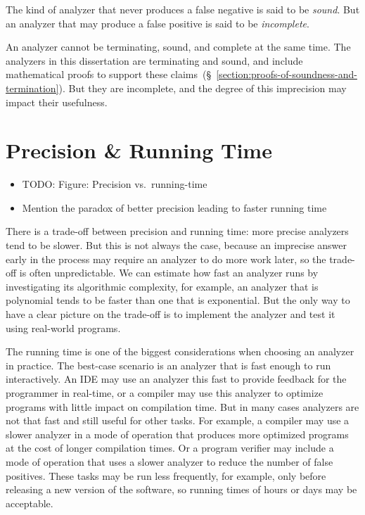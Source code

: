 \documentclass[12pt, oneside]{book}
\begin{document}
The kind of analyzer that never produces a false negative is said to be \emph{sound}. But an analyzer that may produce a false positive is said to be \emph{incomplete}.

An analyzer cannot be terminating, sound, and complete at the same time. The analyzers in this dissertation are terminating and sound, and include mathematical proofs to support these claims~(§~\ref{section:proofs-of-soundness-and-termination}). But they are incomplete, and the degree of this imprecision may impact their usefulness.

\section{Precision \& Running Time}
\label{section:precision-and-running-time}

\begin{itemize}
  \item TODO: Figure: Precision vs.\ running-time
  \item Mention the paradox of better precision leading to faster running time
\end{itemize}

There is a trade-off between precision and running time: more precise analyzers tend to be slower. But this is not always the case, because an imprecise answer early in the process may require an analyzer to do more work later, so the trade-off is often unpredictable. We can estimate how fast an analyzer runs by investigating its algorithmic complexity, for example, an analyzer that is polynomial tends to be faster than one that is exponential. But the only way to have a clear picture on the trade-off is to implement the analyzer and test it using real-world programs.

The running time is one of the biggest considerations when choosing an analyzer in practice. The best-case scenario is an analyzer that is fast enough to run interactively. An IDE may use an analyzer this fast to provide feedback for the programmer in real-time, or a compiler may use this analyzer to optimize programs with little impact on compilation time. But in many cases analyzers are not that fast and still useful for other tasks. For example, a compiler may use a slower analyzer in a mode of operation that produces more optimized programs at the cost of longer compilation times. Or a program verifier may include a mode of operation that uses a slower analyzer to reduce the number of false positives. These tasks may be run less frequently, for example, only before releasing a new version of the software, so running times of hours or days may be acceptable.
\end{document}

